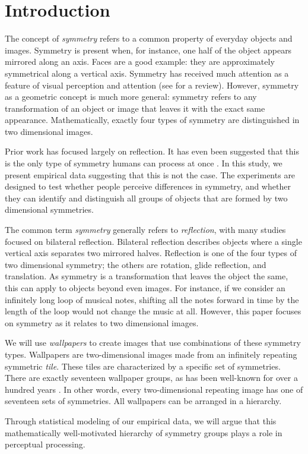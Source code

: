 \section{Introduction}
The concept of \emph{symmetry} refers to a common property of everyday objects and images. Symmetry is present when, for instance, one half of the object appears mirrored along an axis. Faces are a good example: they are approximately symmetrical along a vertical axis. Symmetry has received much attention as a feature of visual perception and attention (see \citep{review} for a review). However, symmetry as a geometric concept is much more general: symmetry refers to any transformation of an object or image that leaves it with the exact same appearance. Mathematically, exactly four types of symmetry are distinguished in two dimensional images.

Prior work has focused largely on reflection. It has even been suggested that this is the only type of symmetry humans can process at once \citep{bio}. In this study, we present empirical data suggesting that this is not the case. The experiments are designed to test whether people perceive differences in symmetry, and whether they can identify and distinguish all groups of objects that are formed by two dimensional symmetries. 

The common term \emph{symmetry} generally refers to \emph{reflection}, with many studies focused on bilateral reflection. Bilateral reflection describes objects where a single vertical axis separates two mirrored halves. Reflection is one of the four types of two dimensional symmetry; the others are rotation, glide reflection, and translation. As symmetry is a transformation that leaves the object the same, this can apply to objects beyond even images. For instance, if we consider an infinitely long loop of musical notes, shifting all the notes forward in time by the length of the loop would not change the music at all. However, this paper focuses on symmetry as it relates to two dimensional images.

We will use \emph{wallpapers} to create images that use combinations of these symmetry types. Wallpapers are two-dimensional images made from an infinitely repeating symmetric \textit{tile}. These tiles are characterized by a specific set of symmetries. There are exactly seventeen wallpaper groups, as has been well-known for over a hundred years \citep{wallpaper-proof}. In other words, every two-dimensional repeating image has one of seventeen sets of symmetries. All wallpapers can be arranged in a hierarchy. 

Through statistical modeling of our empirical data, we will argue that this mathematically well-motivated hierarchy of symmetry groups plays a role in perceptual processing. 